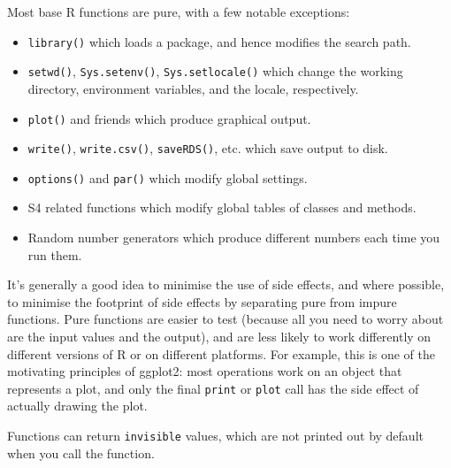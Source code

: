Most base R functions are pure, with a few notable exceptions:

\begin{itemize}
\item
  \texttt{library()} which loads a package, and hence modifies the
  search path.
\item
  \texttt{setwd()}, \texttt{Sys.setenv()}, \texttt{Sys.setlocale()}
  which change the working directory, environment variables, and the
  locale, respectively.
\item
  \texttt{plot()} and friends which produce graphical output.
\item
  \texttt{write()}, \texttt{write.csv()}, \texttt{saveRDS()}, etc. which
  save output to disk.
\item
  \texttt{options()} and \texttt{par()} which modify global settings.
\item
  S4 related functions which modify global tables of classes and
  methods.
\item
  Random number generators which produce different numbers each time you
  run them.
\end{itemize}

It's generally a good idea to minimise the use of side effects, and
where possible, to minimise the footprint of side effects by separating
pure from impure functions. Pure functions are easier to test (because
all you need to worry about are the input values and the output), and
are less likely to work differently on different versions of R or on
different platforms. For example, this is one of the motivating
principles of ggplot2: most operations work on an object that represents
a plot, and only the final \texttt{print} or \texttt{plot} call has the
side effect of actually drawing the plot.

Functions can return \texttt{invisible} values, which are not printed
out by default when you call the function. 

\begin{Shaded}
\begin{Highlighting}[]
\StringTok{ }
\StringTok{ }\NormalTok{(}\NormalTok{)}

\NormalTok{()}
\NormalTok{()}
\NormalTok{() ==}\StringTok{ }
\NormalTok{() ==}\StringTok{ }
\end{Highlighting}
\end{Shaded}

